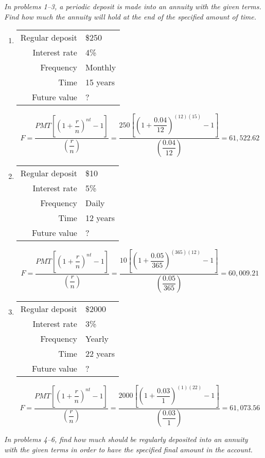 \emph{In problems 1--3, a periodic deposit is made into an annuity with the given terms.  Find how much the annuity will hold at the end of the specified amount of time.}

\begin{enumerate}
\item \begin{tabular}{r l}
Regular deposit & \$250\\
Interest rate & 4\%\\
Frequency & Monthly\\
Time & 15 years\\
Future value & ?
\end{tabular} 
\[F=\dfrac{PMT\left[\left(1+\dfrac{r}{n}\right)^{nt}-1\right]}{\left(\dfrac{r}{n}\right)} = \dfrac{250\left[\left(1+\dfrac{0.04}{12}\right)^{(12)(15)}-1\right]}{\left(\dfrac{0.04}{12}\right)} = 61,522.62\]

\item \begin{tabular}{r l}
Regular deposit & \$10\\
Interest rate & 5\%\\
Frequency & Daily\\
Time & 12 years\\
Future value & ?
\end{tabular} 
\[F=\dfrac{PMT\left[\left(1+\dfrac{r}{n}\right)^{nt}-1\right]}{\left(\dfrac{r}{n}\right)} = \dfrac{10\left[\left(1+\dfrac{0.05}{365}\right)^{(365)(12)}-1\right]}{\left(\dfrac{0.05}{365}\right)} = 60,009.21\]

\item \begin{tabular}{r l}
Regular deposit & \$2000\\
Interest rate & 3\%\\
Frequency & Yearly\\
Time & 22 years\\
Future value & ?
\end{tabular} 
\[F=\dfrac{PMT\left[\left(1+\dfrac{r}{n}\right)^{nt}-1\right]}{\left(\dfrac{r}{n}\right)} = \dfrac{2000\left[\left(1+\dfrac{0.03}{1}\right)^{(1)(22)}-1\right]}{\left(\dfrac{0.03}{1}\right)} = 61,073.56\]
\end{enumerate}

\emph{In problems 4--6, find how much should be regularly deposited into an annuity with the given terms in order to have the specified final amount in the account.}

